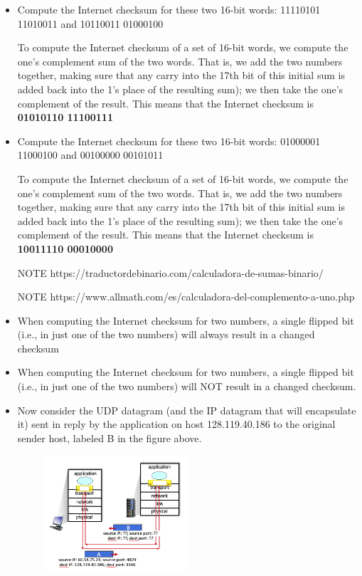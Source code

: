 \begin{itemize}
        \item Compute the Internet checksum for these two 16-bit words: 11110101 11010011 and 10110011 01000100
        \item[] To compute the Internet checksum of a set of 16-bit words, we compute the one's complement sum 
        of the two words. That is, we add the two numbers together, making sure that any carry into the 17th bit
        of this initial sum is added back into the 1's place of the resulting sum); we then take the one's
        complement of the result. This means that the Internet checksum is \textbf{01010110 11100111}
        \item Compute the Internet checksum for these two 16-bit words: 01000001 11000100 and 00100000 00101011
        \item[] To compute the Internet checksum of a set of 16-bit words, we compute the one's complement sum 
        of the two words. That is, we add the two numbers together, making sure that any carry into the 17th bit
        of this initial sum is added back into the 1's place of the resulting sum); we then take the one's
        complement of the result. This means that the Internet checksum is \textbf{10011110 00010000}
        \item[NOTE] https://traductordebinario.com/calculadora-de-sumas-binario/ 
        \item[NOTE] https://www.allmath.com/es/calculadora-del-complemento-a-uno.php
        \item When computing the Internet checksum for two numbers, a single flipped bit (i.e., in just one of
        the two numbers) will always result in a changed checksum
        \item When computing the Internet checksum for two numbers, a single flipped bit (i.e., in just one of
        the two numbers) will NOT result in a changed checksum.
        \item Now consider the UDP datagram (and the IP datagram that will encapsulate it) sent in reply by the
        application on host 128.119.40.186  to the original sender host, labeled B in the figure above.
        \begin{figure}[H]
            \centering
            \includegraphics[width=0.5\textwidth]{img/3.3.9.jpg}

\end{figure}
\end{itemize}
